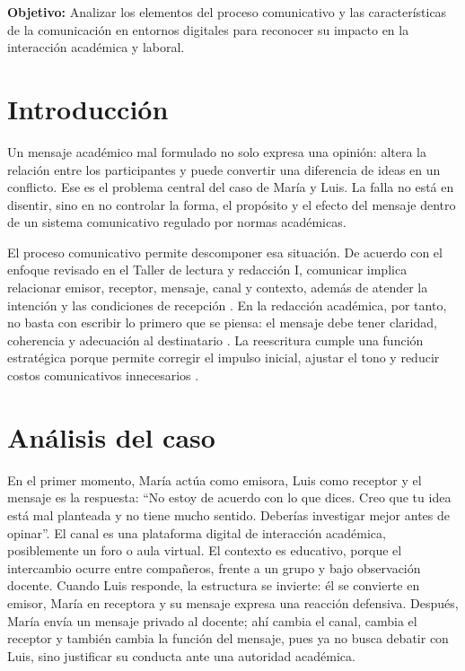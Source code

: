 \documentclass[
	spanish, %
	letterpaper, oneside
]{article}
\begin{document}
\templatePortrait

\templatePagecfg

\begin{abstractd}
	\textbf{Objetivo:} 
	Analizar los elementos del proceso comunicativo y las características de la comunicación en entornos digitales para reconocer su impacto en la interacción académica y laboral.
\end{abstractd}

\templateIndex

\templateFinalcfg


\section{Introducción}

Un mensaje académico mal formulado no solo expresa una opinión: altera la relación entre los participantes y puede convertir una diferencia de ideas en un conflicto. Ese es el problema central del caso de María y Luis. La falla no está en disentir, sino en no controlar la forma, el propósito y el efecto del mensaje dentro de un sistema comunicativo regulado por normas académicas.

El proceso comunicativo permite descomponer esa situación. De acuerdo con el enfoque revisado en el Taller de lectura y redacción I, comunicar implica relacionar emisor, receptor, mensaje, canal y contexto, además de atender la intención y las condiciones de recepción \citep{romero2022taller}. En la redacción académica, por tanto, no basta con escribir lo primero que se piensa: el mensaje debe tener claridad, coherencia y adecuación al destinatario \citep{ayala2005taller}. La reescritura cumple una función estratégica porque permite corregir el impulso inicial, ajustar el tono y reducir costos comunicativos innecesarios \citep{romero2014volver}.

\section{Análisis del caso}

En el primer momento, María actúa como emisora, Luis como receptor y el mensaje es la respuesta: ``No estoy de acuerdo con lo que dices. Creo que tu idea está mal planteada y no tiene mucho sentido. Deberías investigar mejor antes de opinar''. El canal es una plataforma digital de interacción académica, posiblemente un foro o aula virtual. El contexto es educativo, porque el intercambio ocurre entre compañeros, frente a un grupo y bajo observación docente. Cuando Luis responde, la estructura se invierte: él se convierte en emisor, María en receptora y su mensaje expresa una reacción defensiva. Después, María envía un mensaje privado al docente; ahí cambia el canal, cambia el receptor y también cambia la función del mensaje, pues ya no busca debatir con Luis, sino justificar su conducta ante una autoridad académica.
\end{document}
